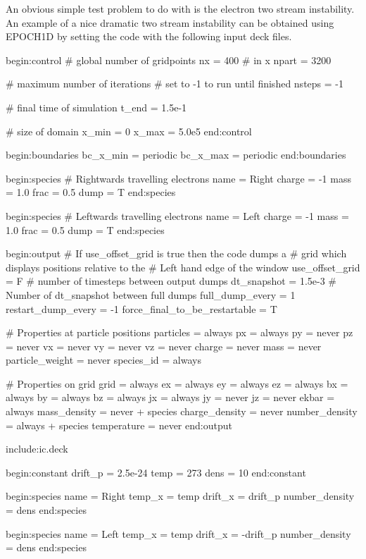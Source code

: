 \documentclass[12pt,a4paper]{article}
\newcommand{\EPOCH}{{\color{warwickdark}\fontfamily{phv}\selectfont{EPOCH}}}
\newenvironment{lboxverbatim}[1]{
\setlength{\FrameSep}{0pt}
\def\FrameCommand{\fboxsep=0pt \colorbox{shadecolor}}
\MakeFramed{\FrameRestore}
\vspace{-13.5pt}
\fvset{label=#1}
\boxverb
}{
\endboxverb
\vspace{-13.5pt}
\endMakeFramed
}
\begin{document}
An obvious simple test problem to do with {\EPOCH} is the electron two stream
instability. An example of a nice dramatic two stream instability can be
obtained using EPOCH1D by setting the code with the following input deck
files.
\begin{lboxverbatim}{input.deck}
begin:control
   # global number of gridpoints
   nx = 400 # in x
   npart = 3200

   # maximum number of iterations
   # set to -1 to run until finished
   nsteps = -1

   # final time of simulation
   t_end = 1.5e-1

   # size of domain
   x_min = 0
   x_max = 5.0e5
end:control

begin:boundaries
   bc_x_min = periodic
   bc_x_max = periodic
end:boundaries

begin:species
   # Rightwards travelling electrons
   name = Right
   charge = -1
   mass = 1.0
   frac = 0.5
   dump = T
end:species

begin:species
   # Leftwards travelling electrons
   name = Left
   charge = -1
   mass = 1.0
   frac = 0.5
   dump = T
end:species

begin:output
   # If use_offset_grid is true then the code dumps a
   # grid which displays positions relative to the
   # Left hand edge of the window
   use_offset_grid = F
   # number of timesteps between output dumps
   dt_snapshot = 1.5e-3
   # Number of dt_snapshot between full dumps
   full_dump_every = 1
   restart_dump_every = -1
   force_final_to_be_restartable = T

   # Properties at particle positions
   particles = always
   px = always
   py = never
   pz = never
   vx = never
   vy = never
   vz = never
   charge = never
   mass = never
   particle_weight = never
   species_id = always

   # Properties on grid
   grid = always
   ex = always
   ey = always
   ez = always
   bx = always
   by = always
   bz = always
   jx = always
   jy = never
   jz = never
   ekbar = always
   mass_density = never + species
   charge_density = never
   number_density = always + species
   temperature = never
end:output

include:ic.deck
\end{lboxverbatim}

\begin{lboxverbatim}{ic.deck}
begin:constant
   drift_p = 2.5e-24
   temp = 273
   dens = 10
end:constant

begin:species
   name = Right
   temp_x = temp
   drift_x = drift_p
   number_density = dens
end:species

begin:species
   name = Left
   temp_x = temp
   drift_x = -drift_p
   number_density = dens
end:species
\end{lboxverbatim}
\end{document}
